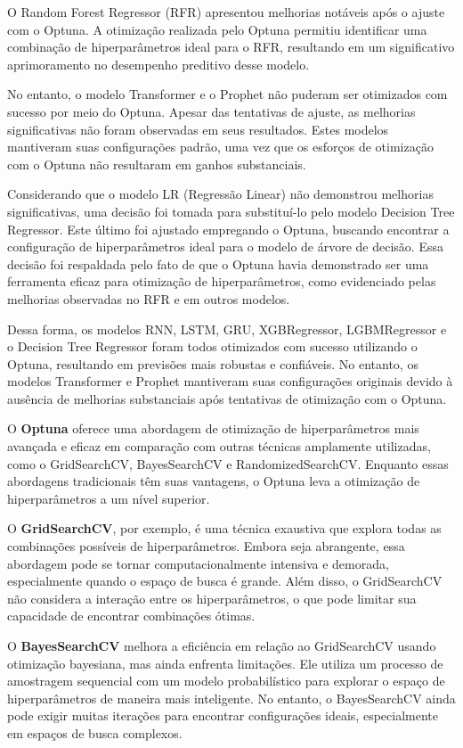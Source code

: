 O Random Forest Regressor (RFR) apresentou melhorias notáveis após o ajuste com o Optuna. A otimização realizada pelo Optuna permitiu identificar uma combinação de hiperparâmetros ideal para o RFR, resultando em um significativo aprimoramento no desempenho preditivo desse modelo.

No entanto, o modelo Transformer e o Prophet não puderam ser otimizados com sucesso por meio do Optuna. Apesar das tentativas de ajuste, as melhorias significativas não foram observadas em seus resultados. Estes modelos mantiveram suas configurações padrão, uma vez que os esforços de otimização com o Optuna não resultaram em ganhos substanciais.

Considerando que o modelo LR (Regressão Linear) não demonstrou melhorias significativas, uma decisão foi tomada para substituí-lo pelo modelo Decision Tree Regressor. Este último foi ajustado empregando o Optuna, buscando encontrar a configuração de hiperparâmetros ideal para o modelo de árvore de decisão. Essa decisão foi respaldada pelo fato de que o Optuna havia demonstrado ser uma ferramenta eficaz para otimização de hiperparâmetros, como evidenciado pelas melhorias observadas no RFR e em outros modelos.

Dessa forma, os modelos RNN, LSTM, GRU, XGBRegressor, LGBMRegressor e o Decision Tree Regressor foram todos otimizados com sucesso utilizando o Optuna, resultando em previsões mais robustas e confiáveis. No entanto, os modelos Transformer e Prophet mantiveram suas configurações originais devido à ausência de melhorias substanciais após tentativas de otimização com o Optuna.

O \textbf{Optuna} oferece uma abordagem de otimização de hiperparâmetros mais avançada e eficaz em comparação com outras técnicas amplamente utilizadas, como o GridSearchCV, BayesSearchCV e RandomizedSearchCV. Enquanto essas abordagens tradicionais têm suas vantagens, o Optuna leva a otimização de hiperparâmetros a um nível superior.

O \textbf{GridSearchCV}, por exemplo, é uma técnica exaustiva que explora todas as combinações possíveis de hiperparâmetros. Embora seja abrangente, essa abordagem pode se tornar computacionalmente intensiva e demorada, especialmente quando o espaço de busca é grande. Além disso, o GridSearchCV não considera a interação entre os hiperparâmetros, o que pode limitar sua capacidade de encontrar combinações ótimas.

O \textbf{BayesSearchCV} melhora a eficiência em relação ao GridSearchCV usando otimização bayesiana, mas ainda enfrenta limitações. Ele utiliza um processo de amostragem sequencial com um modelo probabilístico para explorar o espaço de hiperparâmetros de maneira mais inteligente. No entanto, o BayesSearchCV ainda pode exigir muitas iterações para encontrar configurações ideais, especialmente em espaços de busca complexos.

